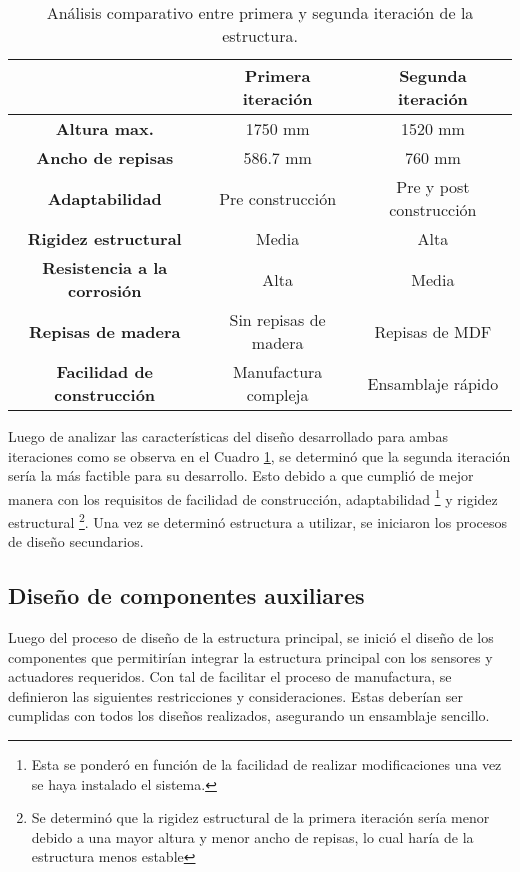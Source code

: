 \begin{table}[H]
	\centering
	\begin{tabular}{|c|c|c|} \hline
		~ & \textbf{Primera iteración} & \textbf{Segunda iteración}\\ \hline
		\textbf{Altura max.} & 1750 mm & 1520 mm  \\ \hline
		\textbf{Ancho de repisas} & 586.7 mm & 760 mm \\ \hline
		\textbf{Adaptabilidad} & Pre construcción & Pre y post construcción \\ \hline
		\textbf{Rigidez estructural} & Media & Alta \\ \hline
		\textbf{Resistencia a la corrosión} & Alta & Media \\ \hline
		\textbf{Repisas de madera} & Sin repisas de madera & Repisas de MDF \\ \hline
		\textbf{Facilidad de construcción} & Manufactura compleja & Ensamblaje rápido \\ \hline
	\end{tabular}
	\caption{Análisis comparativo entre primera y segunda iteración de la estructura.}
	\label{cuadro:compar_iter}
\end{table}

Luego de analizar las características del diseño desarrollado para ambas iteraciones como se observa en el Cuadro \ref{cuadro:compar_iter}, se determinó que la segunda iteración sería la más factible para su desarrollo. Esto debido a que cumplió de mejor manera con los requisitos de facilidad de construcción, adaptabilidad \footnote{Esta se ponderó en función de la facilidad de realizar modificaciones una vez se haya instalado el sistema.} y rigidez estructural \footnote{Se determinó que la rigidez estructural de la primera iteración sería menor debido a una mayor altura y menor ancho de repisas, lo cual haría de la estructura menos estable}. Una vez se determinó estructura a utilizar, se iniciaron los procesos de diseño secundarios.

\subsection{Diseño de componentes auxiliares}

Luego del proceso de diseño de la estructura principal, se inició el diseño de los componentes que permitirían integrar la estructura principal con los sensores y actuadores requeridos. Con tal de facilitar el proceso de manufactura, se definieron las siguientes restricciones y consideraciones. Estas deberían ser cumplidas con todos los diseños realizados, asegurando un ensamblaje sencillo.

